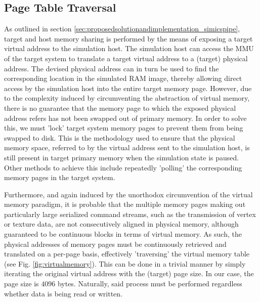 \subsection{Page Table Traversal}
\label{sec:proposedsolutionandimplementation_pagetabletraversal}
As outlined in section \ref{sec:proposedsolutionandimplementation_simicspipe}, target and host memory sharing is performed by the means of exposing a target virtual address to the simulation host.
The simulation host can access the MMU of the target system to translate a target virtual address to a (target) physical address.
The devised physical address can in turn be used to find the corresponding location in the simulated RAM image, thereby allowing direct access by the simulation host into the entire target memory page.
However, due to the complexity induced by circumventing the abstraction of virtual memory, there is no guarantee that the memory page to which the exposed physical address refers has not been swapped out of primary memory.
In order to solve this, we must 'lock' target system memory pages to prevent them from being swapped to disk.
This is the methodology used to ensure that the physical memory space, referred to by the virtual address sent to the simulation host, is still present in target primary memory when the simulation state is paused.
Other methods to achieve this include repeatedly 'polling' the corresponding memory pages in the target system.

Furthermore, and again induced by the unorthodox circumvention of the virtual memory paradigm, it is probable that the multiple memory pages making out particularly large serialized command streams, such as the transmission of vertex or texture data, are not consecutively aligned in physical memory, although guaranteed to be continuous blocks in terms of virtual memory.
As such, the physical addresses of memory pages must be continuously retrieved and translated on a per-page basis, effectively 'traversing' the virtual memory table (see Fig. \ref{fig:virtualmemory}).
This can be done in a trivial manner by simply iterating the original virtual address with the (target) page size.
In our case, the page size is $4096$ bytes.
Naturally, said process must be performed regardless whether data is being read or written.

